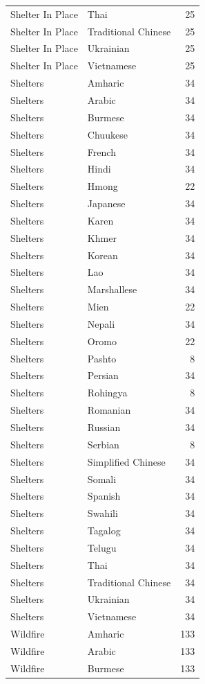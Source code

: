 \begin{longtable}{p{3cm} p{3cm} r}
Shelter In Place & Thai & 25 \\
Shelter In Place & Traditional Chinese & 25 \\
Shelter In Place & Ukrainian & 25 \\
Shelter In Place & Vietnamese & 25 \\
Shelters & Amharic & 34 \\
Shelters & Arabic & 34 \\
Shelters & Burmese & 34 \\
Shelters & Chuukese & 34 \\
Shelters & French & 34 \\
Shelters & Hindi & 34 \\
Shelters & Hmong & 22 \\
Shelters & Japanese & 34 \\
Shelters & Karen & 34 \\
Shelters & Khmer & 34 \\
Shelters & Korean & 34 \\
Shelters & Lao & 34 \\
Shelters & Marshallese & 34 \\
Shelters & Mien & 22 \\
Shelters & Nepali & 34 \\
Shelters & Oromo & 22 \\
Shelters & Pashto & 8 \\
Shelters & Persian & 34 \\
Shelters & Rohingya & 8 \\
Shelters & Romanian & 34 \\
Shelters & Russian & 34 \\
Shelters & Serbian & 8 \\
Shelters & Simplified Chinese & 34 \\
Shelters & Somali & 34 \\
Shelters & Spanish & 34 \\
Shelters & Swahili & 34 \\
Shelters & Tagalog & 34 \\
Shelters & Telugu & 34 \\
Shelters & Thai & 34 \\
Shelters & Traditional Chinese & 34 \\
Shelters & Ukrainian & 34 \\
Shelters & Vietnamese & 34 \\
Wildfire & Amharic & 133 \\
Wildfire & Arabic & 133 \\
Wildfire & Burmese & 133 \\

\end{longtable}
